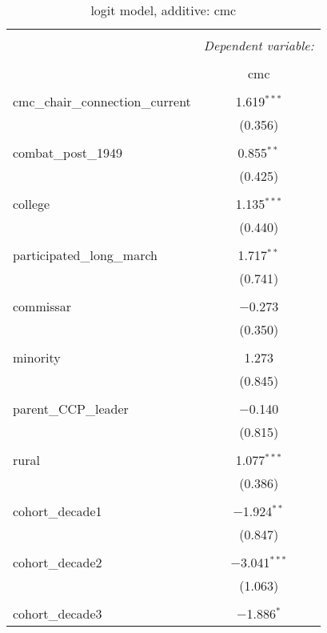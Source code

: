 \documentclass[12pt,letterpaper]{article}
\begin{document}
\begin{table}[!htbp] \centering 
	\caption{logit model, additive: cmc} 
	\label{} 
	\begin{tabular}{@{\extracolsep{5pt}}lc} 
		\\[-1.8ex]\hline 
		\hline \\[-1.8ex] 
		& \multicolumn{1}{c}{\textit{Dependent variable:}} \\ 
		\cline{2-2} 
		\\[-1.8ex] & cmc \\ 
		\hline \\[-1.8ex] 
		cmc\_chair\_connection\_current & 1.619$^{***}$ \\ 
		& (0.356) \\ 
		& \\ 
		combat\_post\_1949 & 0.855$^{**}$ \\ 
		& (0.425) \\ 
		& \\ 
		college & 1.135$^{***}$ \\ 
		& (0.440) \\ 
		& \\ 
		participated\_long\_march & 1.717$^{**}$ \\ 
		& (0.741) \\ 
		& \\ 
		commissar & $-$0.273 \\ 
		& (0.350) \\ 
		& \\ 
		minority & 1.273 \\ 
		& (0.845) \\ 
		& \\ 
		parent\_CCP\_leader & $-$0.140 \\ 
		& (0.815) \\ 
		& \\ 
		rural & 1.077$^{***}$ \\ 
		& (0.386) \\ 
		& \\ 
		cohort\_decade1 & $-$1.924$^{**}$ \\ 
		& (0.847) \\ 
		& \\ 
		cohort\_decade2 & $-$3.041$^{***}$ \\ 
		& (1.063) \\ 
		& \\ 
		cohort\_decade3 & $-$1.886$^{*}$ \\ 

\end{tabular}
\end{table}
\end{document}
